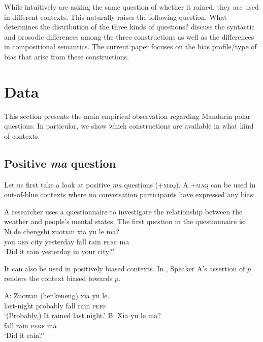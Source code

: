 \documentclass[output=paper,colorlinks,citecolor=brown]{langscibook}
\begin{document}
While intuitively  are  asking the same question of whether it rained, they  are used  in different contexts.  This naturally raises the following question: What determines the distribution of the three kinds of questions?  \citet{YuanHaraGlowinAsia2019} discuss the syntactic and prosodic differences among the three constructions as well as the differences in compositional semantics.  The current paper focuses on the bias profile/type of bias that arise from these constructions.



\section{Data}\label{sec:data}
This section presents the main empirical observation regarding Mandarin polar questions. In particular, we show which constructions are available in what kind of contexts.


\subsection{Positive \textit{ma} question}

Let us first take a look at positive \textit{ma} questions (+\textsc{maq}).  A +\textsc{maq} can be used in out-of-blue contexts where no conversation participants have expressed any bias:
	

	
\begin{exe}
\ex \label{neutral} A researcher uses a questionnaire to investigate the relationship between the weather and people's mental states. The first question in the questionnaire is:\\
	\gll  Ni de chengshi zuotian  xia yu le ma?\\
you \textsc{gen} city  yesterday fall rain \textsc{perf} ma\\
\glt `Did it rain yesterday in your city?' 

\end{exe}
	
It can also be used in positively biased contexts.  In , Speaker A's assertion of $p$ renders the context biased towards $p$. 

\begin{exe}
\ex\label{eg:pbma}
A: \gll Zuowan (henkeneng) xia yu le.\\
		 last-night probably fall rain \textsc{perf}\\
\glt `(Probably,) It rained last night.'
\sn B: \gll Xia yu le ma? \\
    fall rain \textsc{perf} ma\\
\glt `Did it rain?' 
\end{exe}
\end{document}

